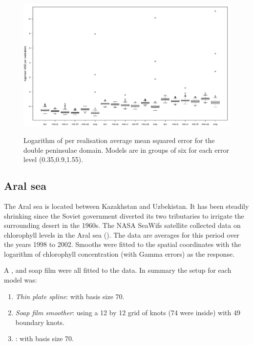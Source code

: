 \begin{figure}
\centering
\includegraphics[width=9.5in]{mds/figs/big-mds-wt2-boxplot.pdf} \\
\caption{Logarithm of per realisation average mean squared error for the double peninsulae domain. Models are in groups of six for each error level (0.35,0.9,1.55).}
\label{big-wt2-mses}
\end{figure}


\subsection{Aral sea}

The Aral sea is located between Kazakhstan and Uzbekistan. It has been steadily shrinking since the Soviet government diverted its two tributaries to irrigate the surrounding desert in the 1960s. The NASA SeaWifs satellite collected data on chlorophyll levels in the Aral sea (\cite{soap}). The data are averages for this period over the years 1998 to 2002. Smooths were fitted to the spatial coordinates with the logarithm of chlorophyll concentration (with Gamma errors) as the response.

A \tprs, \mdsap and soap film were all fitted to the data. In summary the setup for each model was:

\begin{enumerate}
\item \emph{Thin plate spline}:  with basis size 70.
\item \emph{Soap film smoother}: using a 12 by 12 grid of knots (74 were inside) with 49 boundary knots.
\item \emph{\mdsap}: with basis size 70.
\end{enumerate}

